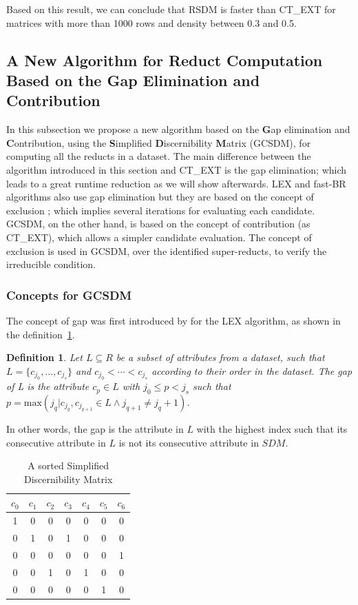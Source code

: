 \documentclass[authoryear,11pt]{elsarticle}
\newtheorem{definition}{Definition}
\begin{document}
	Based on this result, we can conclude that RSDM is faster than CT\_EXT for matrices with more than 1000 rows 
	and density between 0.3 and 0.5.

\subsection{A New Algorithm for Reduct Computation Based on the Gap Elimination and Contribution}\label{GCSDM}
	In this subsection we propose a new algorithm based on the \textbf{G}ap elimination and
	\textbf{C}ontribution, using the \textbf{S}implified \textbf{D}iscernibility \textbf{M}atrix (GCSDM), for
	computing all the reducts in a dataset. The main difference between the algorithm introduced in this section
	and CT\_EXT is the gap elimination; which leads to a great runtime reduction as we will show afterwards.
	LEX and fast-BR algorithms also use gap elimination but they are based on the concept of exclusion
	\citep{Lias13}; which implies 
	several iterations for evaluating each candidate. GCSDM, on the other hand, is based on the concept of 
	contribution (as CT\_EXT), which allows a simpler candidate evaluation. The concept of exclusion is used in
	GCSDM, over the identified super-reducts, to verify the irreducible condition. 

\subsubsection{Concepts for GCSDM}

	The concept of gap was first introduced by \cite{Santiesteban03} for the LEX algorithm, as shown in the
	definition~\ref{def:gap}.
	
	\begin{definition}\label{def:gap}
		Let $L \subseteq R$ be a subset of attributes from a dataset, such that $L = \lbrace c_{j_0},...,c_{j_s}
		\rbrace$ and $c_{j_0}<\cdots <c_{j_s}$ according to their order in the dataset. The gap of L is the
		attribute $c_p \in L$ with $j_0 \leq p <	j_s$ such that $p=\mathrm{max}(j_q | c_{j_q},c_{j_{q+1}} \in 
		L \wedge j_{q+1} \neq j_q+1)$.
	\end{definition}
	
	In other words, the gap is the attribute in $L$ with the highest index such that its consecutive attribute in 
	$L$ is not its consecutive attribute in $SDM$.
	
	\begin{table}[!htb]
      \centering
        \caption{A sorted Simplified Discernibility Matrix}
        \begin{tabular}{ccccccc}\label{tab:SDM1}
            $c_0$ & $c_1$ & $c_2$ & $c_3$ & $c_4$ & $c_5$ & $c_6$\\
        		\hline
        		1&0&0&0&0&0&0\\
        		0&1&0&1&0&0&0\\
        		0&0&0&0&0&0&1\\
        		0&0&1&0&1&0&0\\
        		0&0&0&0&0&1&0\\
        \end{tabular} 
	\end{table}
	
\end{document}
